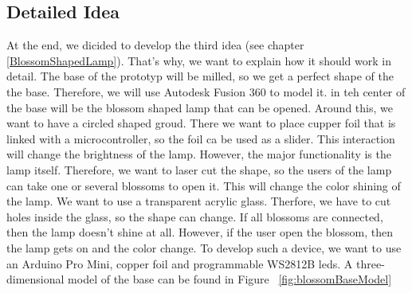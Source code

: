 \documentclass[12pt,twoside,a4paper]{article}
\begin{document}
    \subsection{Detailed Idea}
        \begin{flushleft}
            At the end, we dicided to develop the third idea (see chapter \ref{BlossomShapedLamp}). That's why, we want to explain 
            how it should work in detail. \newline
            The base of the prototyp will be milled, so we get a perfect shape of the the base. Therefore, we will use Autodesk Fusion 360\cite{autodeskFusion360}
            to model it. in teh center of the base will be the blossom shaped lamp that can be opened. Around this, we want to have a 
            circled shaped groud. There we want to place cupper foil that is linked with a microcontroller, %
            so the foil ca be used as a slider. This interaction will change the brightness of the lamp. \newline
            However, the major functionality is the lamp itself. Therefore, we want to laser cut the shape, so the users of the lamp can
            take one or several blossoms to open it. This will change the color shining of the lamp. We want to use a transparent acrylic glass.
            Therfore, we have to cut holes inside the glass, so the shape can change.  \newline
            If all blossoms are connected, then the lamp doesn't shine at all. However, if the user open the blossom, then the lamp gets on
            and the color change. 
            \newline
            \newline
            To develop such a device, we want to use an Arduino Pro Mini, copper foil and programmable WS2812B leds.
            A three-dimensional model of the base can be found in Figure ~\ref{fig:blossomBaseModel}
            

\end{flushleft}
\end{document}
